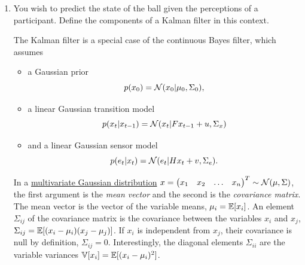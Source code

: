 \documentclass[11pt, a4paper]{article}
\begin{document}
\begin{enumerate}
    \item You wish to predict the state of the ball given the perceptions of a participant. Define the components of a Kalman filter in this context.

    \begin{solution}
        The Kalman filter is a special case of the continuous Bayes filter, which assumes
        \begin{itemize}
            \item a Gaussian prior
            \begin{equation*}
                p(x_0) = \mathcal{N}(x_0 \vert \mu_0, \Sigma_0),
            \end{equation*}
            \item a linear Gaussian transition model
            \begin{equation*}
                p(x_t \vert x_{t - 1}) = \mathcal{N}(x_t \vert F x_{t - 1} + u, \Sigma_x)
            \end{equation*}
            \item and a linear Gaussian sensor model
            \begin{equation*}
                p(e_t \vert x_t) = \mathcal{N}(e_t \vert H x_t + v, \Sigma_e).
            \end{equation*}
        \end{itemize}
        In a \href{https://en.wikipedia.org/wiki/Multivariate_normal_distribution}{multivariate Gaussian distribution} $x = \begin{pmatrix}x_1 & x_2 & \dots & x_n\end{pmatrix}^T \sim \mathcal{N}(\mu, \Sigma)$, the first argument is the \emph{mean vector} and the second is the \emph{covariance matrix}. The mean vector is the vector of the variable means, \ie{} $\mu_i = \mathbb{E}[x_i]$. An element $\Sigma_{ij}$ of the covariance matrix is the covariance between the variables $x_i$ and $x_j$, \ie{} $\Sigma_{ij} = \mathbb{E}[(x_i - \mu_i) (x_j - \mu_j)]$. If $x_i$ is independent from $x_j$, their covariance is null by definition, \ie{} $\Sigma_{ij} = 0$. Interestingly, the diagonal elements $\Sigma_{ii}$ are the variable variances $\mathbb{V}[x_i] = \mathbb{E}[(x_i - \mu_i)^2]$.


\end{solution}
\end{enumerate}
\end{document}
